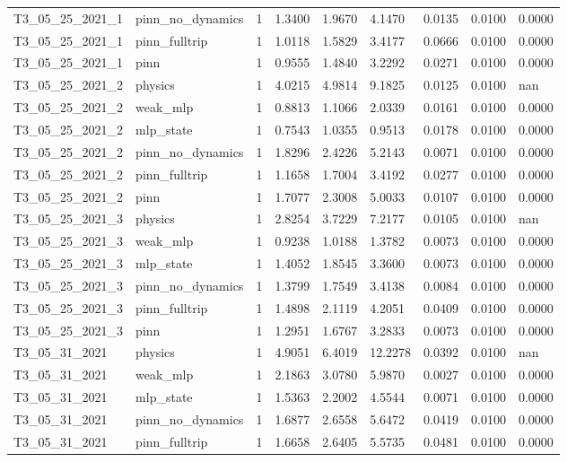 \begin{table}[t]
\begin{tabular}{lllllllll}
T3\_05\_25\_2021\_1 & pinn\_no\_dynamics & 1 & 1.3400 & 1.9670 & 4.1470 & 0.0135 & 0.0100 & 0.0000 \\
T3\_05\_25\_2021\_1 & pinn\_fulltrip & 1 & 1.0118 & 1.5829 & 3.4177 & 0.0666 & 0.0100 & 0.0000 \\
T3\_05\_25\_2021\_1 & pinn & 1 & 0.9555 & 1.4840 & 3.2292 & 0.0271 & 0.0100 & 0.0000 \\
T3\_05\_25\_2021\_2 & physics & 1 & 4.0215 & 4.9814 & 9.1825 & 0.0125 & 0.0100 & nan \\
T3\_05\_25\_2021\_2 & weak\_mlp & 1 & 0.8813 & 1.1066 & 2.0339 & 0.0161 & 0.0100 & 0.0000 \\
T3\_05\_25\_2021\_2 & mlp\_state & 1 & 0.7543 & 1.0355 & 0.9513 & 0.0178 & 0.0100 & 0.0000 \\
T3\_05\_25\_2021\_2 & pinn\_no\_dynamics & 1 & 1.8296 & 2.4226 & 5.2143 & 0.0071 & 0.0100 & 0.0000 \\
T3\_05\_25\_2021\_2 & pinn\_fulltrip & 1 & 1.1658 & 1.7004 & 3.4192 & 0.0277 & 0.0100 & 0.0000 \\
T3\_05\_25\_2021\_2 & pinn & 1 & 1.7077 & 2.3008 & 5.0033 & 0.0107 & 0.0100 & 0.0000 \\
T3\_05\_25\_2021\_3 & physics & 1 & 2.8254 & 3.7229 & 7.2177 & 0.0105 & 0.0100 & nan \\
T3\_05\_25\_2021\_3 & weak\_mlp & 1 & 0.9238 & 1.0188 & 1.3782 & 0.0073 & 0.0100 & 0.0000 \\
T3\_05\_25\_2021\_3 & mlp\_state & 1 & 1.4052 & 1.8545 & 3.3600 & 0.0073 & 0.0100 & 0.0000 \\
T3\_05\_25\_2021\_3 & pinn\_no\_dynamics & 1 & 1.3799 & 1.7549 & 3.4138 & 0.0084 & 0.0100 & 0.0000 \\
T3\_05\_25\_2021\_3 & pinn\_fulltrip & 1 & 1.4898 & 2.1119 & 4.2051 & 0.0409 & 0.0100 & 0.0000 \\
T3\_05\_25\_2021\_3 & pinn & 1 & 1.2951 & 1.6767 & 3.2833 & 0.0073 & 0.0100 & 0.0000 \\
T3\_05\_31\_2021 & physics & 1 & 4.9051 & 6.4019 & 12.2278 & 0.0392 & 0.0100 & nan \\
T3\_05\_31\_2021 & weak\_mlp & 1 & 2.1863 & 3.0780 & 5.9870 & 0.0027 & 0.0100 & 0.0000 \\
T3\_05\_31\_2021 & mlp\_state & 1 & 1.5363 & 2.2002 & 4.5544 & 0.0071 & 0.0100 & 0.0000 \\
T3\_05\_31\_2021 & pinn\_no\_dynamics & 1 & 1.6877 & 2.6558 & 5.6472 & 0.0419 & 0.0100 & 0.0000 \\
T3\_05\_31\_2021 & pinn\_fulltrip & 1 & 1.6658 & 2.6405 & 5.5735 & 0.0481 & 0.0100 & 0.0000 \\

\end{tabular}
\end{table}
